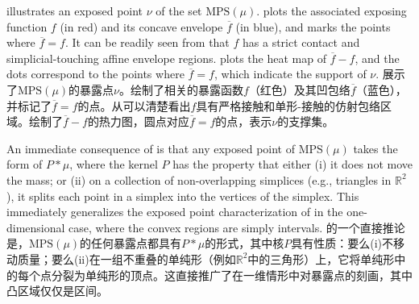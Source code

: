 \documentclass[12pt,letterpaper]{article}
\newenvironment{original}{\color{black}}{}
\newenvironment{translation}{\color{blue}}{}
\theoremstyle{plain}
\theoremstyle{definition}
\theoremstyle{remark}
\newcommand{\R}{\mathds{R}}
\theoremstyle{definition}
\begin{document}
\begin{original}
 illustrates an exposed point $\nu$ of the set $\text{MPS}(\mu)$.  plots the associated exposing function $f$ (in red) and its concave envelope $\overline{f}$ (in blue), and marks the points where $\overline{f}=f$. It can be readily seen from  that $f$ has a strict contact and simplicial-touching affine envelope regions.  plots the heat map of $\overline{f}-f$, and the dots correspond to the points where $\overline{f}=f$, which indicate the support of $\nu$.
\end{original}
\begin{translation}
展示了$\text{MPS}(\mu)$的暴露点$\nu$。绘制了相关的暴露函数$f$（红色）及其凹包络$\overline{f}$（蓝色），并标记了$\overline{f}=f$的点。从可以清楚看出$f$具有严格接触和单形-接触的仿射包络区域。绘制了$\overline{f}-f$的热力图，圆点对应$\overline{f}=f$的点，表示$\nu$的支撑集。
\end{translation}

\begin{original}
An immediate consequence of  is that any exposed point of $\text{MPS}(\mu)$ takes the form of $P*\mu$, where the kernel $P$ has the property that either (i) it does not move the mass; or (ii) on a collection of non-overlapping simplices (e.g., triangles in $\R^2$), it splits each point in a simplex into the vertices of the simplex. This immediately generalizes the exposed point characterization of \citet*{kleiner2021extreme} in the one-dimensional case, where the convex regions are simply intervals.
\end{original}
\begin{translation}
的一个直接推论是，$\text{MPS}(\mu)$的任何暴露点都具有$P*\mu$的形式，其中核$P$具有性质：要么(i)不移动质量；要么(ii)在一组不重叠的单纯形（例如$\R^2$中的三角形）上，它将单纯形中的每个点分裂为单纯形的顶点。这直接推广了\citet*{kleiner2021extreme}在一维情形中对暴露点的刻画，其中凸区域仅仅是区间。
\end{translation}
\end{document}
